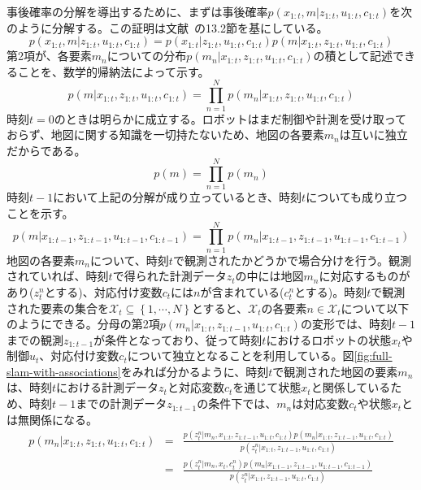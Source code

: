 \documentclass[dvipdfmx,a4paper]{jsarticle}
\begin{document}
事後確率の分解を導出するために、まずは事後確率$p(x_{1 : t}, m | z_{1 : t}, u_{1 : t}, c_{1 : t})$を次のように分解する。この証明は文献~\cite{Thrun07}の13.2節を基にしている。
\begin{equation}
	p(x_{1 : t}, m | z_{1 : t}, u_{1 : t}, c_{1 : t}) = p(x_{1 : t} | z_{1 : t}, u_{1 : t}, c_{1 : t}) p(m | x_{1 : t}, z_{1 : t}, u_{1 : t}, c_{1 : t})
\end{equation}
第2項が、各要素$m_n$についての分布$p(m_n | x_{1 : t}, z_{1 : t}, u_{1 : t}, c_{1 : t})$の積として記述できることを、数学的帰納法によって示す。
\begin{equation}
	p(m | x_{1 : t}, z_{1 : t}, u_{1 : t}, c_{1 : t}) = \prod_{n = 1}^N p(m_n | x_{1 : t}, z_{1 : t}, u_{1 : t}, c_{1 : t})
\end{equation}
時刻$t = 0$のときは明らかに成立する。ロボットはまだ制御や計測を受け取っておらず、地図に関する知識を一切持たないため、地図の各要素$m_n$は互いに独立だからである。
\begin{equation}
	p(m) = \prod_{n = 1}^N p(m_n)
\end{equation}
時刻$t - 1$において上記の分解が成り立っているとき、時刻$t$についても成り立つことを示す。
\begin{equation}
	p(m | x_{1 : t - 1}, z_{1 : t - 1}, u_{1 : t - 1}, c_{1 : t - 1}) = \prod_{n = 1}^N p(m_n | x_{1 : t - 1}, z_{1 : t - 1}, u_{1 : t - 1}, c_{1 : t - 1})
\end{equation}
地図の各要素$m_n$について、時刻$t$で観測されたかどうかで場合分けを行う。観測されていれば、時刻$t$で得られた計測データ$z_t$の中には地図$m_n$に対応するものがあり($z_t^n$とする)、対応付け変数$c_t$には$n$が含まれている($c_t^n$とする)。時刻$t$で観測された要素の集合を$\mathcal{X}_t \subseteq \left\{ 1, \cdots, N \right\}$とすると、$\mathcal{X}_t$の各要素$n \in \mathcal{X}_t$について以下のようにできる。分母の第2項$p(m_n | x_{1 : t}, z_{1 : t - 1}, u_{1 : t}, c_{1 : t})$の変形では、時刻$t - 1$までの観測$z_{1 : t - 1}$が条件となっており、従って時刻$t$におけるロボットの状態$x_t$や制御$u_t$、対応付け変数$c_t$について独立となることを利用している。図\ref{fig:full-slam-with-associations}をみれば分かるように、時刻$t$で観測された地図の要素$m_n$は、時刻$t$における計測データ$z_t$と対応変数$c_t$を通じて状態$x_t$と関係しているため、時刻$t - 1$までの計測データ$z_{1 : t - 1}$の条件下では、$m_n$は対応変数$c_t$や状態$x_t$とは無関係になる。
\begin{eqnarray}
	p(m_n | x_{1 : t}, z_{1 : t}, u_{1 : t}, c_{1 : t}) &=& \frac{p(z_t^n | m_n, x_{1 : t}, z_{1 : t - 1}, u_{1 : t}, c_{1 : t}) p(m_n | x_{1 : t}, z_{1 : t - 1}, u_{1 : t}, c_{1 : t})}{p(z_t^n | x_{1 : t}, z_{1 : t - 1}, u_{1 : t}, c_{1 : t})} \\
	&=& \frac{p(z_t^n | m_n, x_t, c_t^n) p(m_n | x_{1 : t - 1}, z_{1 : t - 1}, u_{1 : t - 1}, c_{1 : t - 1})}{p(z_t^n | x_{1 : t}, z_{1 : t - 1}, u_{1 : t}, c_{1 : t})}
\end{eqnarray}
\end{document}

